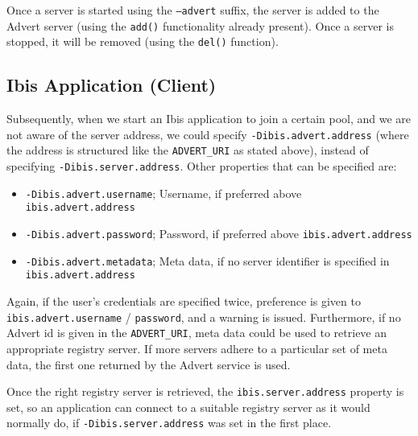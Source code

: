 Once a server is started using the \texttt{--advert} suffix, the server is added
to the Advert server (using the \texttt{add()} functionality already present).
Once a server is stopped, it will be removed (using the \texttt{del()}
function).

\subsection{Ibis Application (Client)}
Subsequently, when we start an Ibis application to join a certain pool, and we
are not aware of the server address, we could specify
\texttt{-Dibis.advert.address} (where the address is structured like the
\texttt{ADVERT\_URI} as stated above), instead of specifying
\texttt{-Dibis.server.address}. Other properties that can be specified are:

\begin{itemize}
  \item \texttt{-Dibis.advert.username}; Username, if preferred above
  	\texttt{ibis.advert.address}
  \item \texttt{-Dibis.advert.password}; Password, if preferred above
  	\texttt{ibis.advert.address} 
  \item \texttt{-Dibis.advert.metadata}; Meta data, if no server identifier is
  	specified in \newline \texttt{ibis.advert.address}
\end{itemize}

Again, if the user's credentials are specified twice, preference is given to
\texttt{ibis.advert.username} / \texttt{password}, and a warning is issued.
Furthermore, if no Advert id is given in the \texttt{ADVERT\_URI}, meta data
could be used to retrieve an appropriate registry server. If more servers
adhere to a particular set of meta data, the first one returned by the Advert
service is used.

Once the right registry server is retrieved, the \texttt{ibis.server.address}
property is set, so an application can connect to a suitable registry server as
it would normally do, if \texttt{-Dibis.server.address} was set in the first
place.

